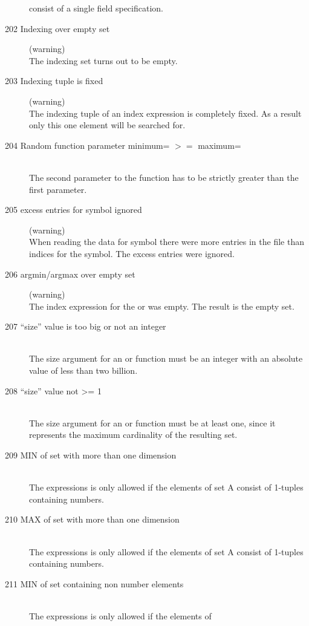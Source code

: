 \begin{description}
  consist of a single field specification.
\item[202 Indexing over empty set] (warning)\ \\
  The indexing set turns out to be empty.
\item[203 Indexing tuple is fixed] (warning)\ \\
  The indexing tuple of an index expression is completely fixed. As a
  result only this one element will be searched for.
\item[204 Random function parameter minimum= \code{xxx} $>=$ maximum=
  \code{yyy}]\ \\
  The second parameter to the function  has to be
  strictly greater than the first parameter.
\item[205 \code{xxx} excess entries for symbol \code{yyy} ignored ]
  (warning)\ \\
  When reading the data for symbol  there were 
   more entries in the file than indices for the symbol.
  The excess entries were ignored.  
\item[206 argmin/argmax over empty set] (warning)\ \\
   The index expression for the  or  was
   empty. The result is the empty set.
\item[207 ``size'' value \code{xxx} is too big or not an integer]\ \\
   The size argument for an  or  function
   must be an integer with an absolute value of less than two billion.
\item[208 ``size'' value \code{xxx} not >= 1]\ \\
   The size argument for an  or  function
   must be at least one, since it represents the maximum cardinality
   of the resulting set.
\item[209 MIN of set with more than one dimension]\ \\
   The expressions  is only allowed if the elements of 
   set A consist of 1-tuples containing numbers.  
\item[210 MAX of set with more than one dimension]\ \\
   The expressions  is only allowed if the elements of 
   set A consist of 1-tuples containing numbers.  
\item[211 MIN of set containing non number elements]\ \\
   The expressions  is only allowed if the elements of 

\end{description}

